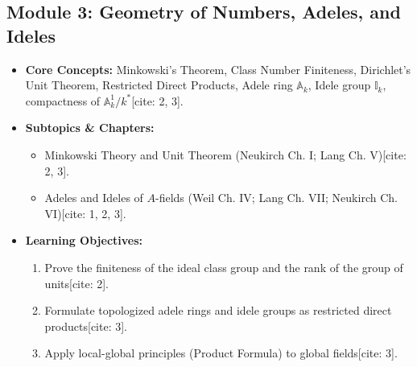 \documentclass[11pt,a4paper]{article}
\begin{document}
\subsection*{Module 3: Geometry of Numbers, Adeles, and Ideles}
\begin{itemize}[leftmargin=*]
    \item \textbf{Core Concepts:} Minkowski's Theorem, Class Number Finiteness, Dirichlet's Unit Theorem, Restricted Direct Products, Adele ring $\mathbb{A}_k$, Idele group $\mathbb{I}_k$, compactness of $\mathbb{A}_k^1/k^*$[cite: 2, 3].
    \item \textbf{Subtopics \& Chapters:}
    \begin{itemize}
        \item Minkowski Theory and Unit Theorem (Neukirch Ch. I; Lang Ch. V)[cite: 2, 3].
        \item Adeles and Ideles of $A$-fields (Weil Ch. IV; Lang Ch. VII; Neukirch Ch. VI)[cite: 1, 2, 3].
    \end{itemize}
    \item \textbf{Learning Objectives:}
    \begin{enumerate}
        \item Prove the finiteness of the ideal class group and the rank of the group of units[cite: 2].
        \item Formulate topologized adele rings and idele groups as restricted direct products[cite: 3].
        \item Apply local-global principles (Product Formula) to global fields[cite: 3].
    \end{enumerate}
\end{itemize}
\end{document}
